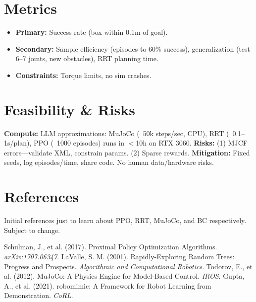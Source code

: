 \documentclass[10pt]{article}
\begin{document}
\vspace{-5pt}
\section*{Metrics}
\begin{itemize}
    \item \textbf{Primary:} Success rate (box within 0.1m of goal).
    \item \textbf{Secondary:} Sample efficiency (episodes to 60\% success), generalization (test 6--7 joints, new obstacles), RRT planning time.
    \item \textbf{Constraints:} Torque limits, no sim crashes.
\end{itemize}

\vspace{-5pt}
\section*{Feasibility \& Risks}
\textbf{Compute:} LLM approximations: MuJoCo (~50k steps/sec, CPU), RRT (~0.1--1s/plan), PPO (~1000 episodes) runs in $<$10h on RTX 3060. \textbf{Risks:} (1) MJCF errors—validate XML, constrain params. (2) Sparse rewards. \textbf{Mitigation:} Fixed seeds, log episodes/time, share code. No human data/hardware risks.

\vspace{-5pt}
\section*{References}
Initial references just to learn about PPO, RRT, MuJoCo, and BC respectively.
Subject to change.
\begin{thebibliography}{1}
     Schulman, J., et al. (2017). Proximal Policy Optimization Algorithms. \textit{arXiv:1707.06347}.
     LaValle, S. M. (2001). Rapidly-Exploring Random Trees: Progress and Prospects. \textit{Algorithmic and Computational Robotics}.
     Todorov, E., et al. (2012). MuJoCo: A Physics Engine for Model-Based Control. \textit{IROS}.
     Gupta, A., et al. (2021). robomimic: A Framework for Robot Learning from Demonstration. \textit{CoRL}.
\end{thebibliography}
\end{document}
